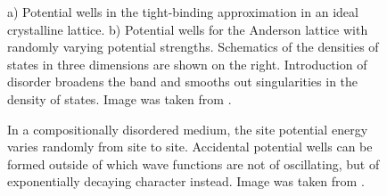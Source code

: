 \documentclass[10pt,a4paper]{article}
\begin{document}
\begin{minipage}[t]{0.56\textwidth}
\end{minipage}\hfill
\begin{minipage}[t]{0.42\textwidth} 
\begin{figure}[H]
\caption{a) Potential wells in the tight-binding approximation in an ideal crystalline lattice. b) Potential wells for the Anderson lattice with randomly varying potential strengths. Schematics of the densities of states in three dimensions are shown on the right. Introduction of disorder broadens the band and smooths out singularities in the density of states. Image was taken from \cite{Mott}.  }
\label{fig:band_structure} 
\end{figure}
\begin{figure}[H]
\caption{In a compositionally disordered medium, the site potential energy varies randomly from site to site. Accidental potential wells can be formed outside of which wave functions are not of oscillating, but of exponentially decaying character instead. Image was taken from \cite{Kramer}.}
\label{fig:accidental_wells} 
\end{figure}

\end{minipage}
\end{document}
